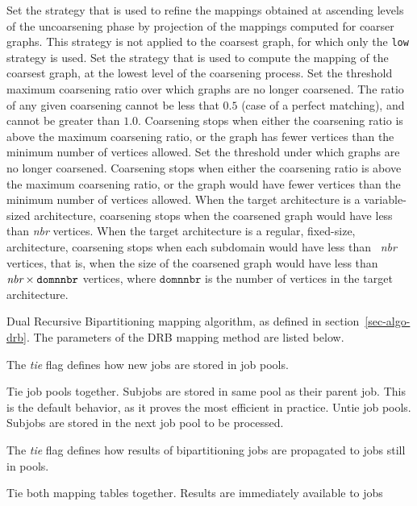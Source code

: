\begin{itemize}
\begin{itemize}
Set the strategy that is used to refine the mappings obtained
at ascending levels of the uncoarsening phase by projection of the
mappings computed for coarser graphs.
This strategy is not applied to the coarsest graph, for which only the
{\tt low} strategy is used.
\iteme[{\tt low=}{\it strat}]
Set the strategy that is used to compute the mapping of the
coarsest graph, at the lowest level of the coarsening process.
\iteme[{\tt rat=}{\it rat}]
Set the threshold maximum coarsening ratio over which graphs are no longer
coarsened. The ratio of any given coarsening cannot be less that $0.5$
(case of a perfect matching), and cannot be greater than $1.0$.
Coarsening stops when either the coarsening ratio is above the maximum
coarsening ratio, or the graph has fewer vertices than the minimum number of
vertices allowed.
\iteme[{\tt vert=}{\it nbr}]
Set the threshold under which graphs are no longer
coarsened. Coarsening stops when either the coarsening ratio is above
the maximum coarsening ratio, or the graph would have fewer vertices
than the minimum number of vertices allowed. When the target
architecture is a variable-sized architecture, coarsening stops when
the coarsened graph would have less than \mbox{\it nbr} vertices. When
the target architecture is a regular, fixed-size, architecture,
coarsening stops when each subdomain would have less than \mbox{\it
  nbr} vertices, that is, when the size of the coarsened graph would
have less than $\mbox{\it nbr}\times\mathtt{domnnbr}$ vertices,
where $\mathtt{domnnbr}$ is the number of vertices in the target
architecture.
\end{itemize}
\iteme[{\tt r}]
Dual Recursive Bipartitioning mapping algorithm, as defined in
section~\ref{sec-algo-drb}. The parameters of the DRB mapping method are
listed below.
\begin{itemize}
\iteme[{\tt job=}{\it tie}]
The {\it tie\/} flag defines how new jobs are stored in job pools.
\begin{itemize}
\iteme[{\tt t}]
Tie job pools together. Subjobs are stored in same pool as their parent job.
This is the default behavior, as it proves the most efficient in practice.
\iteme[{\tt u}]
Untie job pools. Subjobs are stored in the next job pool to be processed.
\end{itemize}
\iteme[{\tt map=}{\it tie}]
The {\it tie\/} flag defines how results of bipartitioning jobs are
propagated to jobs still in pools.
\begin{itemize}
\iteme[{\tt t}]
Tie both mapping tables together. Results are immediately available to jobs

\end{itemize}
\end{itemize}
\end{itemize}
